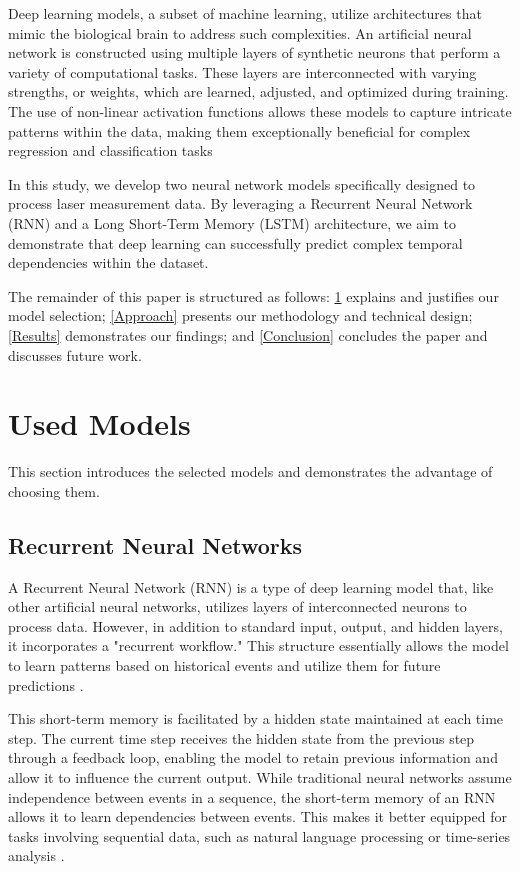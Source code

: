 \documentclass[conference]{IEEEtran}
\begin{document}
Deep learning models, a subset of machine learning, utilize architectures that mimic the biological brain to address such complexities. An artificial neural network is constructed using multiple layers of synthetic neurons that perform a variety of computational tasks. These layers are interconnected with varying strengths, or weights, which are learned, adjusted, and optimized during training. The use of non-linear activation functions allows these models to capture intricate patterns within the data, making them exceptionally beneficial for complex regression and classification tasks \cite{b2}

In this study, we develop two neural network models specifically designed to process laser measurement data. By leveraging a Recurrent Neural Network (RNN) and a Long Short-Term Memory (LSTM) architecture, we aim to demonstrate that deep learning can successfully predict complex temporal dependencies within the dataset.

The remainder of this paper is structured as follows: \cref{Models} explains and justifies our model selection; \cref{Approach} presents our methodology and technical design; \cref{Results} demonstrates our findings; and \cref{Conclusion} concludes the paper and discusses future work.




\section{Used Models}
\label{Models}
This section introduces the selected models and demonstrates the advantage of choosing them.

\subsection{Recurrent Neural Networks}
\label{RNN}
A Recurrent Neural Network (RNN) is a type of deep learning model that, like other artificial neural networks, utilizes layers of interconnected neurons to process data. However, in addition to standard input, output, and hidden layers, it incorporates a "recurrent workflow." This structure essentially allows the model to learn patterns based on historical events and utilize them for future predictions \cite{b3}.

This short-term memory is facilitated by a hidden state maintained at each time step. The current time step receives the hidden state from the previous step through a feedback loop, enabling the model to retain previous information and allow it to influence the current output. While traditional neural networks assume independence between events in a sequence, the short-term memory of an RNN allows it to learn dependencies between events. This makes it better equipped for tasks involving sequential data, such as natural language processing or time-series analysis \cite{b4}.
\end{document}
